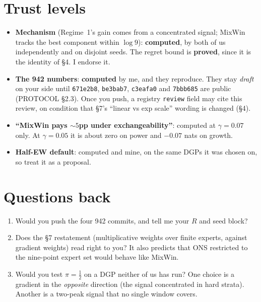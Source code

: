 \documentclass[11pt]{article}
\begin{document}
\section{Trust levels}
\begin{itemize}[nosep]
\item \textbf{Mechanism} (Regime~1's gain comes from a concentrated signal; MixWin tracks the best component within $\log 9$): \textbf{computed}, by both of us independently and on disjoint seeds. The regret bound is \textbf{proved}, since it is the identity of \S4. I endorse it.
\item \textbf{The 942 numbers}: \textbf{computed} by me, and they reproduce. They stay \emph{draft} on your side until \texttt{671e2b8}, \texttt{be3bab7}, \texttt{c3eafa0} and \texttt{7bbb685} are public (PROTOCOL \S2.3). Once you push, a registry \texttt{review} field may cite this review, on condition that \S7's ``linear vs exp scale'' wording is changed (\S4).
\item \textbf{``MixWin pays ${\sim}5$pp under exchangeability''}: computed at $\gamma=0.07$ only. At $\gamma=0.05$ it is about zero on power and $-0.07$ nats on growth.
\item \textbf{Half-EW default}: computed and mine, on the same DGPs it was chosen on, so treat it as a proposal.
\end{itemize}

\section{Questions back}
\begin{enumerate}[nosep]
\item Would you push the four 942 commits, and tell me your $R$ and seed block?
\item Does the \S7 restatement (multiplicative weights over finite experts, against gradient weights) read right to you? It also predicts that ONS restricted to the nine-point expert set would behave like MixWin.
\item Would you test $\pi=\frac12$ on a DGP neither of us has run? One choice is a gradient in the \emph{opposite} direction (the signal concentrated in hard strata). Another is a two-peak signal that no single window covers.
\end{enumerate}
\end{document}
